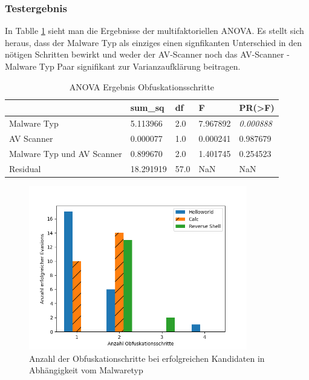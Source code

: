  \subsubsection{Testergebnis}
 In Tablle \ref{ANOVA} sieht man die Ergebnisse der multifaktoriellen ANOVA. Es stellt sich heraus, dass der Malware Typ als einziges einen signfikanten Unterschied in den nötigen Schritten bewirkt und weder der AV-Scanner noch das AV-Scanner - Malware Typ Paar signifikant zur Varianzaufklärung beitragen.
\begin{table}[hp]
\begin{tabular}{@{}lllll@{}}
\toprule
                           & sum\_sq   & df   & F        & PR(\textgreater{}F) \\ \midrule
Malware Typ                & 5.113966  & 2.0  & 7.967892 & \textit{0.000888}            \\
AV Scanner                 & 0.000077  & 1.0  & 0.000241 & 0.987679            \\
Malware Typ und AV Scanner & 0.899670  & 2.0  & 1.401745 & 0.254523            \\
Residual                   & 18.291919 & 57.0 & NaN      & NaN                 \\ \bottomrule
\end{tabular}
\label{ANOVA}
\caption{ANOVA Ergebnis Obfuskationsschritte}
\end{table} 
\begin{figure}[h]
    \centering
    \includegraphics[width=0.85\textwidth]{gfx/Hypothesendiagramme/combined_obfuscation_steps.png}
    \caption{Anzahl der Obfuskationschritte bei erfolgreichen Kandidaten in Abhängigkeit vom Malwaretyp}
    \label{fig:steps_per_Solve}
\end{figure}


